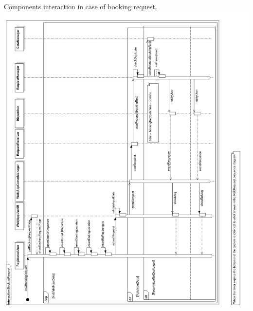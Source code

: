 \documentclass[11pt,titlepage]{article} %
\newenvironment{changemargin}[3]{%
\begin{list}{}{%
\setlength{\topsep}{0pt}%
\setlength{\headsep}{#3}%
\setlength{\leftmargin}{#1}%
\setlength{\rightmargin}{#2}%
\setlength{\listparindent}{\parindent}%
\setlength{\itemindent}{\parindent}%
\setlength{\parsep}{\parskip}%
}%
\item[]}{\end{list}}
\begin{document}
\begin{changemargin}{0cm}{0cm}{-2.5cm}
	Components interaction in case of booking request.\newline
	\noindent
	\includegraphics[scale=0.42]{sd2.png}
\end{changemargin}
\newpage
\end{document}
